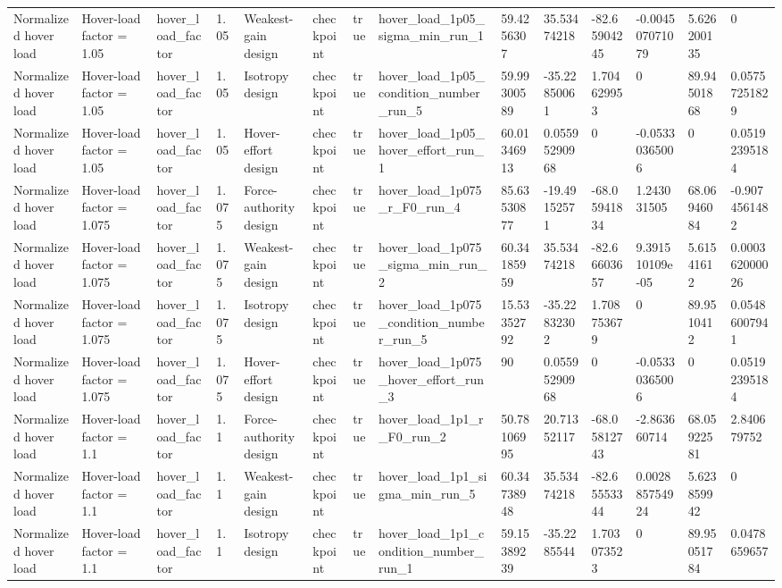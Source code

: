 \begin{tabular}{@{}llllllllllllll@{}}
Normalized hover load & Hover-load factor = 1.05 & hover\_load\_factor & 1.05 & Weakest-gain design & checkpoint & true & hover\_load\_1p05\_sigma\_min\_run\_1 & 59.4256307 & 35.53474218 & -82.65904245 & -0.004507071079 & 5.626200135 & 0 \\
Normalized hover load & Hover-load factor = 1.05 & hover\_load\_factor & 1.05 & Isotropy design & checkpoint & true & hover\_load\_1p05\_condition\_number\_run\_5 & 59.99300589 & -35.22850061 & 1.704629953 & 0 & 89.94501868 & 0.05757251829 \\
Normalized hover load & Hover-load factor = 1.05 & hover\_load\_factor & 1.05 & Hover-effort design & checkpoint & true & hover\_load\_1p05\_hover\_effort\_run\_1 & 60.01346913 & 0.05595290968 & 0 & -0.05330365006 & 0 & 0.05192395184 \\
Normalized hover load & Hover-load factor = 1.075 & hover\_load\_factor & 1.075 & Force-authority design & checkpoint & true & hover\_load\_1p075\_r\_F0\_run\_4 & 85.63530877 & -19.49152571 & -68.05941834 & 1.243031505 & 68.06946084 & -0.9074561482 \\
Normalized hover load & Hover-load factor = 1.075 & hover\_load\_factor & 1.075 & Weakest-gain design & checkpoint & true & hover\_load\_1p075\_sigma\_min\_run\_2 & 60.34185959 & 35.53474218 & -82.66603657 & 9.391510109e-05 & 5.61541612 & 0.000362000026 \\
Normalized hover load & Hover-load factor = 1.075 & hover\_load\_factor & 1.075 & Isotropy design & checkpoint & true & hover\_load\_1p075\_condition\_number\_run\_5 & 15.53352792 & -35.22832302 & 1.708753679 & 0 & 89.9510412 & 0.05486007941 \\
Normalized hover load & Hover-load factor = 1.075 & hover\_load\_factor & 1.075 & Hover-effort design & checkpoint & true & hover\_load\_1p075\_hover\_effort\_run\_3 & 90 & 0.05595290968 & 0 & -0.05330365006 & 0 & 0.05192395184 \\
Normalized hover load & Hover-load factor = 1.1 & hover\_load\_factor & 1.1 & Force-authority design & checkpoint & true & hover\_load\_1p1\_r\_F0\_run\_2 & 50.78106995 & 20.71352117 & -68.05812743 & -2.863660714 & 68.05922581 & 2.840679752 \\
Normalized hover load & Hover-load factor = 1.1 & hover\_load\_factor & 1.1 & Weakest-gain design & checkpoint & true & hover\_load\_1p1\_sigma\_min\_run\_5 & 60.34738948 & 35.53474218 & -82.65553344 & 0.002885754924 & 5.623859942 & 0 \\
Normalized hover load & Hover-load factor = 1.1 & hover\_load\_factor & 1.1 & Isotropy design & checkpoint & true & hover\_load\_1p1\_condition\_number\_run\_1 & 59.15389239 & -35.2285544 & 1.703073523 & 0 & 89.95051784 & 0.0478659657 \\

\end{tabular}
